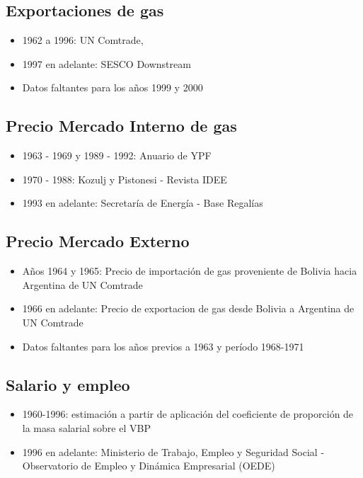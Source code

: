 \documentclass[letterpaper,11pt, spanish]{scrartcl}
\begin{document}
\subsection{Exportaciones de gas}
\begin{itemize}
    \item 1962 a 1996: UN Comtrade,
   \item 1997 en adelante: SESCO Downstream
  \item Datos faltantes para los años 1999 y 2000
\end{itemize}


\subsection{Precio Mercado Interno de gas}
\begin{itemize}
    \item  1963 - 1969 y 1989 - 1992: Anuario de YPF
  \item  1970 - 1988:  Kozulj y Pistonesi - Revista IDEE
\item  1993 en adelante: Secretaría de Energía - Base Regalías
\end{itemize}
  
 \subsection{Precio Mercado Externo}
\begin{itemize}
    \item Años 1964 y 1965: Precio de importación de gas proveniente de Bolivia hacia Argentina de UN Comtrade
  \item 1966 en adelante: Precio de exportacion de gas desde Bolivia a Argentina de UN Comtrade
  \item Datos faltantes para los años previos a 1963 y período 1968-1971
\end{itemize}
 
 
\subsection{Salario y empleo}
\begin{itemize}
    \item  1960-1996: estimación a partir de aplicación del coeficiente de proporción de la masa salarial sobre el VBP
  \item 1996 en adelante: Ministerio de Trabajo, Empleo y Seguridad Social - Observatorio de Empleo y Dinámica Empresarial (OEDE)
\end{itemize}
\end{document}
